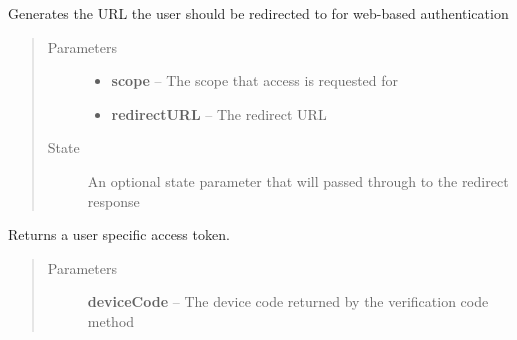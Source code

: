 \documentclass[letterpaper,10pt,english]{sphinxmanual}
\begin{document}
\begin{fulllineitems}
\begin{fulllineitems}
\begin{quote}
\begin{description}
\end{description}\end{quote}

\end{fulllineitems}


\begin{fulllineitems}
\label{Available modules:BaseSpacePy.api.BaseSpaceAPI.BaseSpaceAPI.getWebVerificationCode}
Generates the URL the user should be redirected to for web-based authentication
\begin{quote}\begin{description}
\item[{Parameters}] \leavevmode\begin{itemize}
\item {} 
\textbf{scope} -- The scope that access is requested for

\item {} 
\textbf{redirectURL} -- The redirect URL

\end{itemize}

\item[{State }] \leavevmode
An optional state parameter that will passed through to the redirect response

\end{description}\end{quote}

\end{fulllineitems}


\begin{fulllineitems}
\label{Available modules:BaseSpacePy.api.BaseSpaceAPI.BaseSpaceAPI.obtainAccessToken}
Returns a user specific access token.
\begin{quote}\begin{description}
\item[{Parameters}] \leavevmode
\textbf{deviceCode} -- The device code returned by the verification code method

\end{description}\end{quote}


\end{fulllineitems}
\end{fulllineitems}
\end{document}
